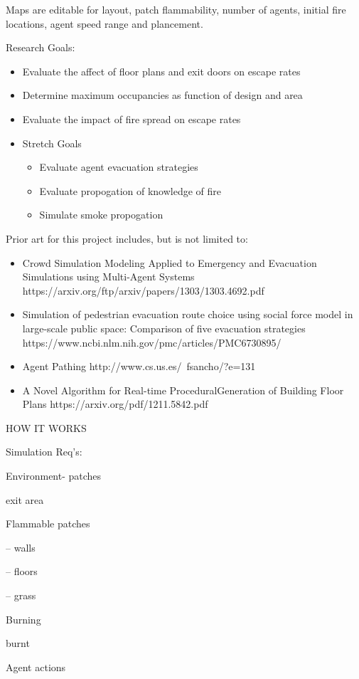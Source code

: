 \documentclass[12pt,letterpaper]{article}
\begin{document}
Maps are editable for layout, patch flammability, number of agents, initial fire locations, agent speed range and plancement.

Research Goals:

\begin{itemize}
\item Evaluate the affect of floor plans and exit doors on escape rates
\item Determine maximum occupancies as function of design and area
\item Evaluate the impact of fire spread on escape rates
\item Stretch Goals
\begin{itemize}
\item Evaluate agent evacuation strategies
\item Evaluate propogation of knowledge of fire
\item Simulate smoke propogation
\end{itemize}
\end{itemize}


Prior art for this project includes, but is not limited to:
\begin{itemize}
\item Crowd Simulation Modeling Applied to Emergency and Evacuation Simulations using Multi-Agent Systems https://arxiv.org/ftp/arxiv/papers/1303/1303.4692.pdf
\item Simulation of pedestrian evacuation route choice using social force model in large-scale public space: Comparison of five evacuation strategies https://www.ncbi.nlm.nih.gov/pmc/articles/PMC6730895/
\item Agent Pathing http://www.cs.us.es/~fsancho/?e=131
\item A Novel Algorithm for Real-time ProceduralGeneration of Building Floor Plans https://arxiv.org/pdf/1211.5842.pdf
\end{itemize}

HOW IT WORKS

Simulation Req's:

Environment- patches

    exit area

    Flammable patches

-- walls

-- floors

-- grass

    Burning

    burnt

Agent actions
\end{document}
